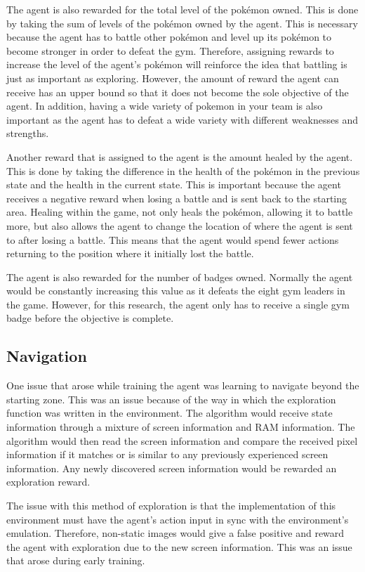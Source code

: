 The agent is also rewarded for the total level of the pokémon owned. This is done by taking the sum of levels of the pokémon owned by the agent. This is necessary because the agent has to battle other pokémon and level up its pokémon to become stronger in order to defeat the gym. Therefore, assigning rewards to increase the level of the agent's pokémon will reinforce the idea that battling is just as important as exploring. However, the amount of reward the agent can receive has an upper bound so that it does not become the sole objective of the agent. In addition, having a wide variety of pokemon in your team is also important as the agent has to defeat a wide variety with different weaknesses and strengths. 

Another reward that is assigned to the agent is the amount healed by the agent. This is done by taking the difference in the health of the pokémon in the previous state and the health in the current state. This is important because the agent receives a negative reward when losing a battle and is sent back to the starting area. Healing within the game, not only heals the pokémon, allowing it to battle more, but also allows the agent to change the location of where the agent is sent to after losing a battle. This means that the agent would spend fewer actions returning to the position where it initially lost the battle.

The agent is also rewarded for the number of badges owned. Normally the agent would be constantly increasing this value as it defeats the eight gym leaders in the game. However, for this research, the agent only has to receive a single gym badge before the objective is complete.

\subsection{Navigation}

One issue that arose while training the agent was learning to navigate beyond the starting zone. This was an issue because of the way in which the exploration function was written in the environment. The algorithm would receive state information through a mixture of screen information and RAM information. The algorithm would then read the screen information and compare the received pixel information if it matches or is similar to any previously experienced screen information. Any newly discovered screen information would be rewarded an exploration reward. 

The issue with this method of exploration is that the implementation of this environment must have the agent's action input in sync with the environment's emulation. Therefore, non-static images would give a false positive and reward the agent with exploration due to the new screen information. This was an issue that arose during early training. 

